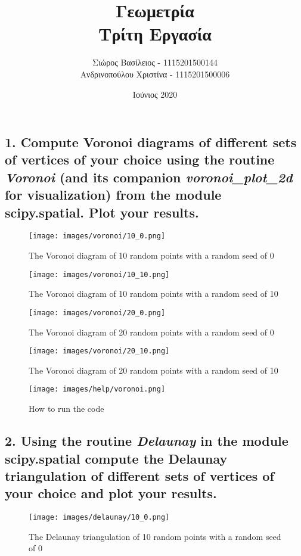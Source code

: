 \documentclass[12pt]{article}
\title{\hugeΥπολογιστική Γεωμετρία\\Τρίτη Εργασία}
\author{Σιώρος Βασίλειος - 1115201500144\\Ανδρινοπούλου Χριστίνα - 1115201500006}
\date{Ιούνιος 2020}
\newenvironment{matlab}
	{\begin{figure}[H]\centering\captionsetup{justification=centering}}
	{\end{figure}}
\begin{document}
\maketitle


\pagebreak


\subsection*{1. Compute Voronoi diagrams of different sets of vertices of your choice using
    the routine \textit{Voronoi} (and its companion \textit{voronoi\_plot\_2d} for visualization) from the module
    \textbf{scipy.spatial}. Plot your results.}

\begin{matlab}
    \texttt{[image: images/voronoi/10\_0.png]}
    \caption{The Voronoi diagram of 10 random points with a random seed of 0}
\end{matlab}

\begin{matlab}
    \texttt{[image: images/voronoi/10\_10.png]}
    \caption{The Voronoi diagram of 10 random points with a random seed of 10}
\end{matlab}

\begin{matlab}
    \texttt{[image: images/voronoi/20\_0.png]}
    \caption{The Voronoi diagram of 20 random points with a random seed of 0}
\end{matlab}

\begin{matlab}
    \texttt{[image: images/voronoi/20\_10.png]}
    \caption{The Voronoi diagram of 20 random points with a random seed of 10}
\end{matlab}

\begin{matlab}
    \texttt{[image: images/help/voronoi.png]}
    \caption{How to run the code}
\end{matlab}

\pagebreak

\subsection*{2. Using the routine \textit{Delaunay} in the module \textbf{scipy.spatial} compute the Delaunay
    triangulation of different sets of vertices of your choice and plot your results.}

\begin{matlab}
    \texttt{[image: images/delaunay/10\_0.png]}
    \caption{The Delaunay triangulation of 10 random points with a random seed of 0}
\end{matlab}
\end{document}
